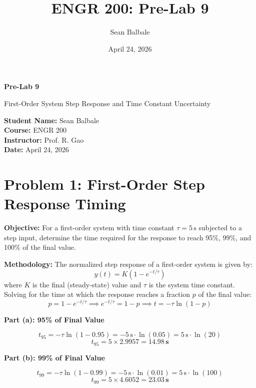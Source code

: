 \documentclass[11pt]{article}
\title{ENGR 200: Pre-Lab 9}
\author{Sean Balbale}
\date{April 24, 2026}
\begin{document}
\begin{titlepage}
  \begin{center}
    \vspace*{1in}

    \Huge
    \textbf{Pre-Lab 9}

    \LARGE
    First-Order System Step Response and Time Constant Uncertainty

    \vspace{3in}

    \textbf{Student Name:} Sean Balbale
    \\ \textbf{Course:} ENGR 200
    \\ \textbf{Instructor:} Prof. R. Gao
    \\ \textbf{Date:} April 24, 2026

    \vfill

  \end{center}
\end{titlepage}

\newpage

\section*{Problem 1: First-Order Step Response Timing}

\textbf{Objective:} For a first-order system with time constant $\tau = 5\,\text{s}$ subjected to a
step input, determine the time required for the response to reach 95\%, 99\%, and 100\% of the
final value.

\textbf{Methodology:}
The normalized step response of a first-order system is given by:
\[
  y(t) = K\!\left(1 - e^{-t/\tau}\right)
\]
where $K$ is the final (steady-state) value and $\tau$ is the system time constant. Solving for
the time at which the response reaches a fraction $p$ of the final value:
\[
  p = 1 - e^{-t/\tau}
  \implies
  e^{-t/\tau} = 1 - p
  \implies
  t = -\tau\ln(1 - p)
\]

\textbf{Part (a): 95\% of Final Value}

\[
  t_{95} = -\tau \ln(1 - 0.95) = -5\,\text{s} \cdot \ln(0.05) = 5\,\text{s} \cdot \ln(20)
\]
\[
  t_{95} = 5 \times 2.9957 = \mathbf{14.98\,\text{s}}
\]

\textbf{Part (b): 99\% of Final Value}

\[
  t_{99} = -\tau \ln(1 - 0.99) = -5\,\text{s} \cdot \ln(0.01) = 5\,\text{s} \cdot \ln(100)
\]
\[
  t_{99} = 5 \times 4.6052 = \mathbf{23.03\,\text{s}}
\]
\end{document}
